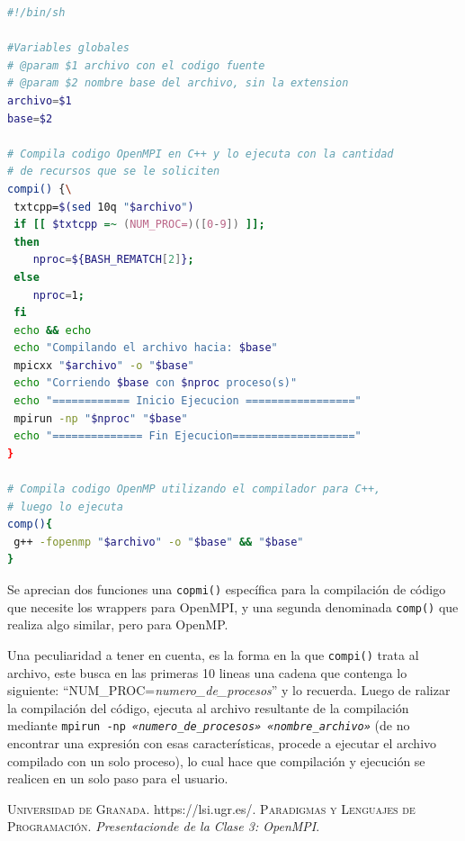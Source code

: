 \documentclass{article}
\begin{document}
\begin{lstlisting}[language=bash, caption={Script de compilaci\'on}]
#!/bin/sh

#Variables globales
# @param $1 archivo con el codigo fuente
# @param $2 nombre base del archivo, sin la extension
archivo=$1
base=$2

# Compila codigo OpenMPI en C++ y lo ejecuta con la cantidad
# de recursos que se le soliciten
compi() {\
 txtcpp=$(sed 10q "$archivo")
 if [[ $txtcpp =~ (NUM_PROC=)([0-9]) ]];
 then
    nproc=${BASH_REMATCH[2]};
 else
    nproc=1;
 fi
 echo && echo
 echo "Compilando el archivo hacia: $base"
 mpicxx "$archivo" -o "$base"
 echo "Corriendo $base con $nproc proceso(s)"
 echo "============ Inicio Ejecucion ================="
 mpirun -np "$nproc" "$base"
 echo "============== Fin Ejecucion==================="
}

# Compila codigo OpenMP utilizando el compilador para C++,
# luego lo ejecuta
comp(){
 g++ -fopenmp "$archivo" -o "$base" && "$base"
}
\end{lstlisting}

Se aprecian dos funciones una \texttt{copmi()} espec\'ifica para la compilaci\'on
de c\'odigo que necesite los wrappers para OpenMPI, y una segunda denominada
\texttt{comp()} que realiza algo similar, pero para OpenMP.

Una peculiaridad a tener en cuenta, es la forma en la que \texttt{compi()}
trata al archivo, este busca en las primeras 10 lineas una cadena que contenga
lo siguiente: ``NUM\_PROC=\textit{numero\_de\_procesos}'' y lo recuerda. Luego de
ralizar la compilaci\'on del c\'odigo, ejecuta al archivo resultante de
la compilaci\'on mediante \texttt{mpirun -np \textit{«numero\_de\_procesos»
«nombre\_archivo»}} (de no encontrar una expresi\'on con esas caracter\'isticas,
procede a ejecutar el archivo compilado con un solo proceso), lo cual hace que compilaci\'on y
ejecuci\'on se realicen en un solo paso para el usuario.


\newpage
\begin{thebibliography}{99}
	 \textsc{Universidad de
Granada}. https://lsi.ugr.es/.
	\textsc{Paradigmas y
Lenguajes de Programaci\'on}. \textit{Presentacionde de la Clase 3: OpenMPI}.
\end{thebibliography}
\end{document}
